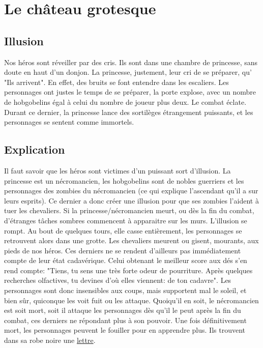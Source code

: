 \documentclass[a4paper, 11pt]{article}
\begin{document}
\section{Le château grotesque}
\subsection{Illusion}
Nos héros sont réveiller par des cris. Ils sont dans une chambre de princesse, sans doute en haut d'un donjon. La princesse, justement, leur cri de se préparer, qu' "Ils arrivent". En effet, des bruits se font entendre dans les escaliers. Les personnages ont justes le temps de se préparer, la porte explose, avec un nombre de hobgobelins égal à celui du nombre de joueur plus deux. Le combat éclate. Durant ce dernier, la princesse lance des sortilèges étrangement puissants, et les personnages se sentent comme immortels.

\subsection{Explication} 
Il faut savoir que les héros sont victimes d'un puissant sort d'illusion. La princesse est un nécromancien, les hobgobelins sont de nobles guerriers et les personnages des zombies du nécromancien (ce qui explique l'ascendant qu'il a sur leurs esprits). Ce dernier a donc créer une illusion pour que ses zombies l'aident à tuer les chevaliers. Si la princesse/nécromancien meurt, ou dès la fin du combat, d'étranges tâches sombres commencent à apparaitre sur les murs. L'illusion se rompt. Au bout de quelques tours, elle casse entièrement, les personnages se retrouvent alors dans une grotte.
\newline
Les chevaliers meurent ou gisent, mourants, aux pieds de nos héros. Ces derniers ne se rendent d’ailleurs pas immédiatement compte de leur état  cadavérique. Celui obtenant le meilleur score aux dés s'en rend compte: "Tiens, tu sens une très forte odeur de pourriture. Après quelques recherches olfactives, tu devines d'où elles viennent: de ton cadavre". Les personnages sont donc insensibles aux coups, mais supportent mal le soleil, et bien sûr, quiconque les voit fuit ou les attaque.
\newline
Quoiqu'il en soit, le nécromancien est soit mort, soit il attaque les personnages dès qu'il le peut après la fin du combat, ces derniers ne répondant plus à son pouvoir. Une fois définitivement mort, les personnages peuvent le fouiller pour en apprendre plus. Ils trouvent dans sa robe noire une \hyperlink{lettre}{lettre}.
\end{document}

